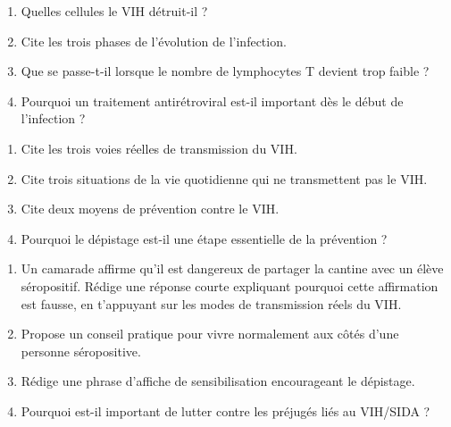 \begin{enumerate}[label=\arabic*)]
\item Quelles cellules le VIH détruit-il ?
\item Cite les trois phases de l'évolution de l'infection.
\item Que se passe-t-il lorsque le nombre de lymphocytes T devient trop faible ?
\item Pourquoi un traitement antirétroviral est-il important dès le début de
l'infection ?
\end{enumerate}

\begin{enumerate}[label=\arabic*)]
\item Cite les trois voies réelles de transmission du VIH.
\item Cite trois situations de la vie quotidienne qui ne transmettent pas le VIH.
\item Cite deux moyens de prévention contre le VIH.
\item Pourquoi le dépistage est-il une étape essentielle de la prévention ?
\end{enumerate}

\begin{enumerate}[label=\arabic*)]
\item Un camarade affirme qu'il est dangereux de partager la cantine avec un élève
séropositif. Rédige une réponse courte expliquant pourquoi cette affirmation est fausse,
en t'appuyant sur les modes de transmission réels du VIH.
\item Propose un conseil pratique pour vivre normalement aux côtés d'une personne
séropositive.
\item Rédige une phrase d'affiche de sensibilisation encourageant le dépistage.
\item Pourquoi est-il important de lutter contre les préjugés liés au VIH/SIDA ?
\end{enumerate}


